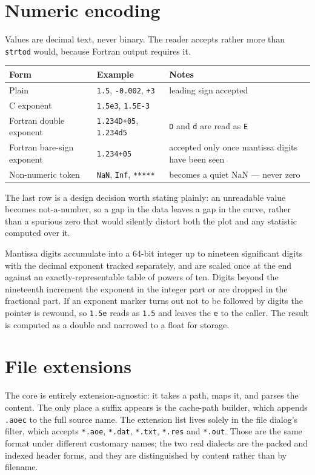 \documentclass[11pt,a4paper,oneside]{report}
\newcommand{\code}[1]{\texttt{#1}}
\begin{document}
\section{Numeric encoding}

Values are decimal text, never binary. The reader accepts rather more than
\code{strtod} would, because Fortran output requires it.

\begin{center}
\small
\begin{tabular}{@{}p{}p{}p{}@{}}
\toprule
\textbf{Form} & \textbf{Example} & \textbf{Notes} \\
\midrule
Plain & \code{1.5}, \code{-0.002}, \code{+3} & leading sign accepted \\
C exponent & \code{1.5e3}, \code{1.5E-3} & \\
Fortran double exponent & \code{1.234D+05}, \code{1.234d5} & \code{D} and \code{d} are read as \code{E} \\
Fortran bare-sign exponent & \code{1.234+05} & accepted only once mantissa digits have been seen \\
Non-numeric token & \code{NaN}, \code{Inf}, \code{*****} & becomes a quiet NaN --- never zero \\
\bottomrule
\end{tabular}
\end{center}

The last row is a design decision worth stating plainly: an unreadable value
becomes not-a-number, so a gap in the data leaves a gap in the curve, rather than
a spurious zero that would silently distort both the plot and any statistic
computed over it.

Mantissa digits accumulate into a 64-bit integer up to nineteen significant
digits with the decimal exponent tracked separately, and are scaled once at the
end against an exactly-representable table of powers of ten. Digits beyond the
nineteenth increment the exponent in the integer part or are dropped in the
fractional part. If an exponent marker turns out not to be followed by digits the
pointer is rewound, so \code{1.5e} reads as \code{1.5} and leaves the \code{e} to
the caller. The result is computed as a double and narrowed to a float for
storage.

\section{File extensions}

The core is entirely extension-agnostic: it takes a path, maps it, and parses the
content. The only place a suffix appears is the cache-path builder, which appends
\code{.aoec} to the full source name. The extension list lives solely in the file
dialog's filter, which accepts \code{*.aoe}, \code{*.dat}, \code{*.txt},
\code{*.res} and \code{*.out}. Those are the same format under different
customary names; the two real dialects are the packed and indexed header forms,
and they are distinguished by content rather than by filename.
\end{document}

